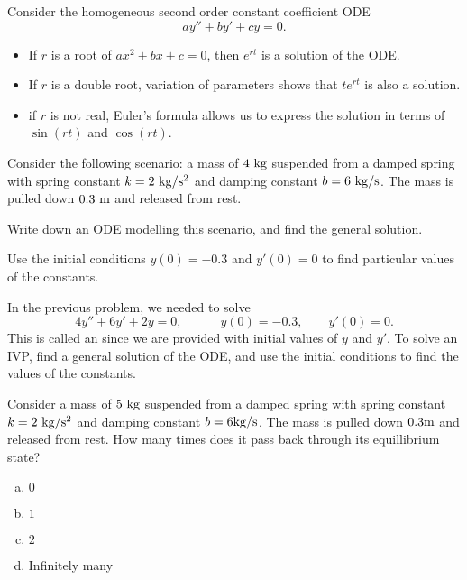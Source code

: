 
\begin{applicationActivities}

\begin{observation}
Consider the homogeneous second order constant coefficient ODE \[ay''+by'+cy=0.\]
\vfill
\begin{itemize}
\item If \(r\) is a root of \(ax^2+bx+c=0\), then \(e^{rt}\) is a solution of the ODE.
\item If \(r\) is a double root, variation of parameters shows that \(te^{rt}\) is also a solution.
\item if \(r\) is not real, Euler's formula allows us to express the solution in terms of \(\sin(rt)\) and \(\cos(rt)\).
\end{itemize}
\end{observation}

\begin{activity}{15}
Consider the following scenario:  a mass of \(4\ {\rm kg}\) suspended from a damped spring with spring constant \(k=2\ {\rm kg/s^2}\) and damping constant \(b= 6\ {\rm kg/s}\).  
\vfill
The mass is pulled down \(0.3\ {\rm m}\) and released from rest.  
\begin{subactivity}
Write down an ODE modelling this scenario, and find the general solution.
\end{subactivity}
\begin{subactivity}
Use the initial conditions \(y(0)=-0.3\) and \(y'(0)=0\) to find particular values of the constants.
\end{subactivity}
\end{activity}

\begin{definition}
In the previous problem, we needed to solve
\[ 4y''+6y'+2y = 0, \hspace{3em} y(0)=-0.3, \hspace{2em} y'(0)=0 .\]
This is called an  since we are provided with initial values of \(y\) and \(y'\).
\vfill
To solve an IVP, find a general solution of the ODE, and use the initial conditions to find the values of the constants.
\end{definition}

\begin{activity}{15}
Consider a mass of \(5\ {\rm kg}\) suspended from a damped spring with spring constant \(k=2\ {\rm kg/s^2}\) and damping constant \(b= 6{\rm kg/s}\).  
\vfill
The mass is pulled down \(0.3 {\rm m}\) and released from rest.  How many times does it pass back through its equillibrium state?
\vfill
\begin{enumerate}[(a)]
\item \(0\)
\item \(1\)
\item \(2\)
\item Infinitely many
\end{enumerate}
\end{activity}


\end{applicationActivities}
